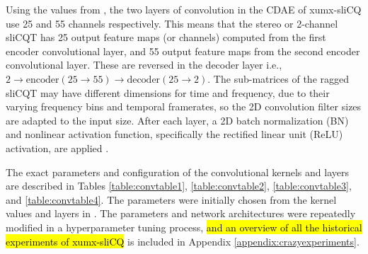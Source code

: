 \documentclass[report.tex]{subfiles}
\begin{document}
Using the values from \textcite{plumbley2}, the two layers of convolution in the CDAE of xumx-sliCQ use 25 and 55 channels respectively. This means that the stereo or 2-channel sliCQT has 25 output feature maps (or channels) computed from the first encoder convolutional layer, and 55 output feature maps from the second encoder convolutional layer. These are reversed in the decoder layer i.e., $2 \rightarrow \text{encoder}(25 \rightarrow 55) \rightarrow \text{decoder}(25 \rightarrow 2)$. The sub-matrices of the ragged sliCQT may have different dimensions for time and frequency, due to their varying frequency bins and temporal framerates, so the 2D convolution filter sizes are adapted to the input size. After each layer, a 2D batch normalization (BN) and nonlinear activation function, specifically the rectified linear unit (ReLU) activation, are applied \parencite{plumbley2}.

The exact parameters and configuration of the convolutional kernels and layers are described in Tables \ref{table:convtable1}, \ref{table:convtable2}, \ref{table:convtable3}, and \ref{table:convtable4}. The parameters were initially chosen from the kernel values and layers in \textcite{plumbley1, plumbley2}. The parameters and network architectures were repeatedly modified in a hyperparameter tuning process, \hl{and an overview of all the historical experiments of xumx-sliCQ} is included in Appendix \ref{appendix:crazyexperiments}.
\end{document}
